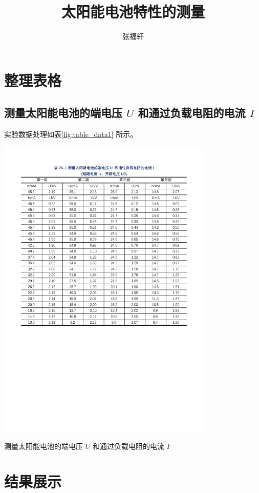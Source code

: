 \documentclass[12pt]{article}
\title{太阳能电池特性的测量} %
\author{张福轩}
\begin{document}
\maketitle

\section{\normalfont 整理表格}

\subsection{\normalfont 测量太阳能电池的端电压 $U$ 和通过负载电阻的电流 $I$}

实验数据处理如表\ref{fig:table_data1} 所示。

\begin{table}[H] %
    \centering
    \includegraphics[width=0.78\textwidth]{./figures/表1.pdf} 
    \caption{测量太阳能电池的端电压 $U$  和通过负载电阻的电流 $I$}
    \label{fig:table_data1}
\end{table}

\FloatBarrier

\section{\normalfont 结果展示}
\end{document}
